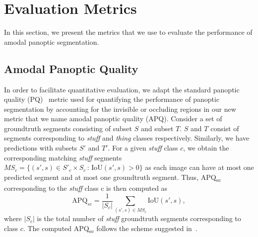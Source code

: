 \documentclass[10pt,twocolumn,letterpaper]{article}
\begin{document}
\section{Evaluation Metrics}
In this section, we present the metrics that we use to evaluate the performance of amodal panoptic segmentation. 

\subsection{Amodal Panoptic Quality}

In order to facilitate quantitative evaluation, we adapt the standard panoptic quality (PQ)~\cite{kirillov2019panoptic} metric used for quantifying the performance of panoptic segmentation by accounting for the invisible or occluding regions in our new metric that we name amodal panoptic quality (APQ). Consider a set of groundtruth segments consisting of subset $S$ and subset $T$. $S$ and $T$ consist of segments corresponding to \textit{stuff} and \textit{thing} classes respectively. Similarly, we have predictions with subsets $S'$ and $T'$. For a given \textit{stuff} class $c$, we obtain the corresponding matching \textit{stuff} segments $MS_c=\{(s', s)\in S'_c\times S_c\,:\, \text{IoU}(s', s)>0\}$ as each image can have at most one predicted segment and at most one groundtruth segment. Thus, APQ\textsubscript{sc} corresponding to the \textit{stuff} class c is then computed as
\begin{equation}
\text{APQ}_{sc} = \frac{1}{|S_c|}\sum_{(s',s)\in MS_c}\text{IoU}(s',s),
\end{equation}
where $|S_c|$ is the total number of \textit{stuff} groundtruth segments corresponding to class $c$. The computed APQ\textsubscript{sc} follows the scheme suggested in~\cite{porzi2019seamless}.
\end{document}
